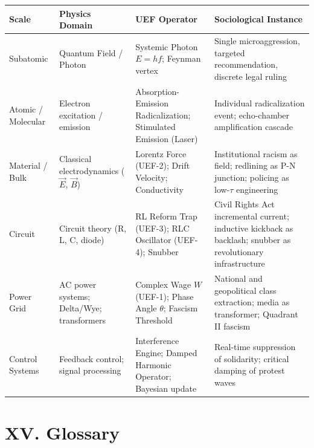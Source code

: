 \documentclass[12pt]{book}
\numberwithin{equation}{chapter}
\begin{document}
\begin{center}
\begin{tabular}{llll}
\toprule
Scale & Physics Domain & UEF Operator & Sociological Instance  \\
\midrule
Subatomic & Quantum Field / Photon & Systemic Photon $E = hf$; Feynman vertex & Single microaggression, targeted recommendation, discrete legal ruling  \\
Atomic / Molecular & Electron excitation / emission & Absorption-Emission Radicalization; Stimulated Emission (Laser) & Individual radicalization event; echo-chamber amplification cascade  \\
Material / Bulk & Classical electrodynamics ($\vec{E}$, $\vec{B}$) & Lorentz Force (UEF-2); Drift Velocity; Conductivity & Institutional racism as field; redlining as P-N junction; policing as low-$\tau$ engineering  \\
Circuit & Circuit theory (R, L, C, diode) & RL Reform Trap (UEF-3); RLC Oscillator (UEF-4); Snubber & Civil Rights Act incremental current; inductive kickback as backlash; snubber as revolutionary infrastructure  \\
Power Grid & AC power systems; Delta/Wye; transformers & Complex Wage $W$ (UEF-1); Phase Angle $\theta$; Fascism Threshold & National and geopolitical class extraction; media as transformer; Quadrant II fascism  \\
Control Systems & Feedback control; signal processing & Interference Engine; Damped Harmonic Operator; Bayesian update & Real-time suppression of solidarity; critical damping of protest waves  \\
\bottomrule
\end{tabular}
\end{center}

\section{XV. Glossary}
\end{document}
